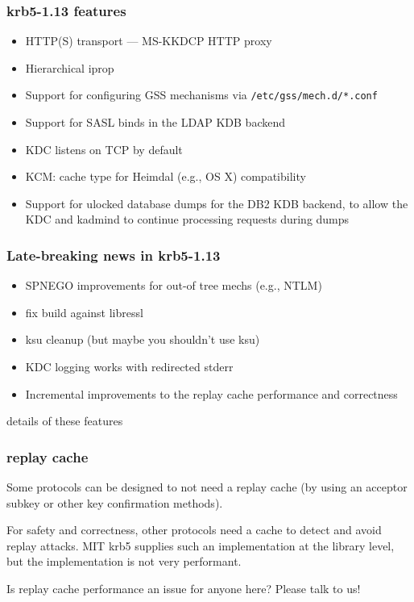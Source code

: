 \documentclass{beamer}
\begin{document}
\begin{frame}[fragile]
\frametitle{krb5-1.13 features}
\begin{itemize}
\item{HTTP(S) transport --- MS-KKDCP HTTP proxy}
\item{Hierarchical iprop}
\item{Support for configuring GSS mechanisms via \verb+/etc/gss/mech.d/*.conf+}
\item{Support for SASL binds in the LDAP KDB backend}
\item{KDC listens on TCP by default}
\item{KCM: cache type for Heimdal (e.g., OS X) compatibility}
\item{Support for ulocked database dumps for the DB2 KDB backend, to allow
	the KDC and kadmind to continue processing requests during dumps}
\end{itemize}
\end{frame}

\begin{frame}
\frametitle{Late-breaking news in krb5-1.13}
\begin{itemize}
\item{SPNEGO improvements for out-of tree mechs (e.g., NTLM)}
\item{fix build against libressl}
\item{ksu cleanup (but maybe you shouldn't use ksu)}
\item{KDC logging works with redirected stderr}
\item{Incremental improvements to the replay cache performance and
	correctness}
\end{itemize}
\end{frame}

\begin{frame}
details of these features
\end{frame}

\begin{frame}
\frametitle{replay cache}
Some protocols can be designed to not need a replay cache (by using
an acceptor subkey or other key confirmation methods).

\vspace{1em}
For safety and correctness, other protocols need a cache to detect and
avoid replay attacks.  MIT krb5 supplies such an implementation at the
library level, but the implementation is not very performant.

\vspace{1em}
Is replay cache performance an issue for anyone here?  Please talk to us!
\end{frame}
\end{document}
